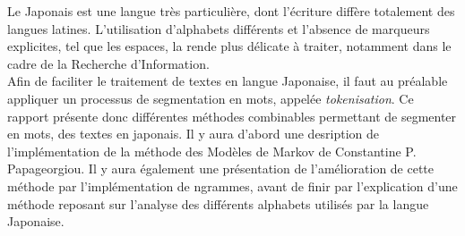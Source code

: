
Le Japonais est une langue très particulière, dont l'écriture diffère totalement des langues latines. L'utilisation d'alphabets différents et l'absence de marqueurs explicites, tel que les espaces, la rende plus délicate à traiter, notamment dans le cadre de la Recherche d'Information.\\

Afin de faciliter le traitement de textes en langue Japonaise, il faut au préalable appliquer un processus de segmentation en mots, appelée \textit{tokenisation}. Ce rapport présente donc différentes méthodes combinables permettant de segmenter en mots, des textes en japonais. Il y aura d'abord une desription de l'implémentation de la méthode des Modèles de Markov de Constantine P. Papageorgiou. Il y aura également une présentation de l'amélioration de cette méthode par l'implémentation de ngrammes, avant de finir par l'explication d'une méthode reposant sur l'analyse des différents alphabets utilisés par la langue Japonaise.\\
